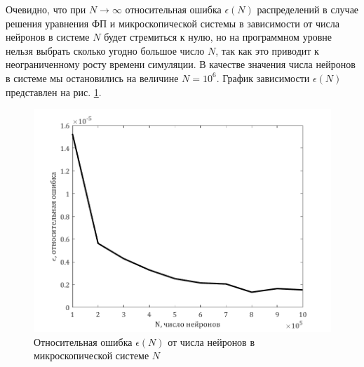 Очевидно, что при $N\to\infty$ относительная ошибка $\epsilon(N)$ распределений в случае решения уравнения ФП и микроскопической системы в зависимости от числа нейронов в системе $N$ будет стремиться к нулю, но на программном уровне нельзя выбрать сколько угодно большое число $N$, так как это приводит к неограниченному росту времени симуляции. В качестве значения числа нейронов в системе мы остановились на величине $N=10^6$. График зависимости $\epsilon(N)$ представлен на рис. \ref{pic:4}.
\begin{figure}[H]
	\centering
	\includegraphics[width=\linewidth]{pic/epsilonN(N).png}
	\caption{Относительная ошибка $\epsilon(N)$ от числа нейронов в микроскопической системе $N$}
	\label{pic:4}
\end{figure}

